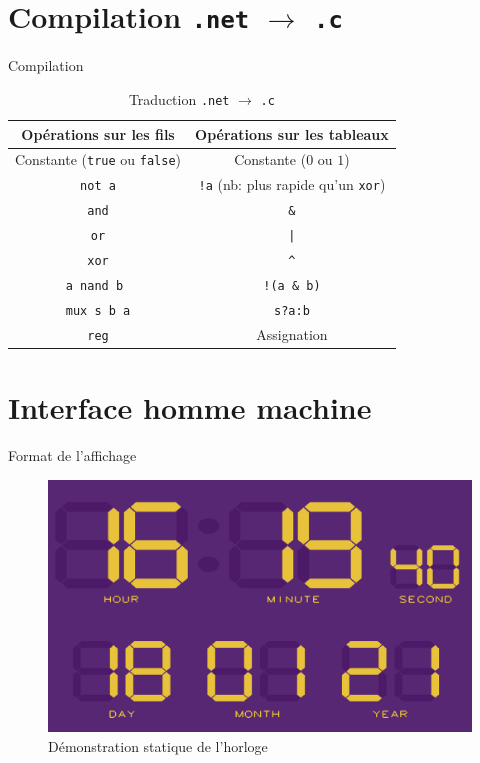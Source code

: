 \documentclass[intlimits, 10pt]{beamer}
\begin{document}
	\section{Compilation \texttt{.net} $\rightarrow$ \texttt{.c}}
	
	\begin{frame}{Compilation}
			\begin{table}
				\begin{tabular}{|c|c|}
				\hline
				Opérations sur les fils & Opérations sur les tableaux \\
				\hline
				Constante (\texttt{true} ou \texttt{false})& Constante ($0$ ou $1$)  \\
				\hline
				\texttt{not a}& \texttt{!a}  (nb: plus rapide qu'un \texttt{xor})\\
				\hline
				\texttt{and} & \texttt{\&}  \\
				\hline
				\texttt{or}& \texttt{|} \\
				\hline
				\texttt{xor}& \texttt{\^} \\
				\hline
				\texttt{a nand b }& \texttt{!(a \& b)} \\
				\hline
				\texttt{mux s b a}& \texttt{s?a:b} \\
				\hline
				\texttt{reg}&Assignation\\
				\hline
			\end{tabular}
			\caption{Traduction \texttt{.net} $\rightarrow$ \texttt{.c}}
		\end{table}
	\end{frame}
	
	\section{Interface homme machine}
	
	\begin{frame}{Format de l'affichage}
		\begin{figure}
			\centering
			\includegraphics[width=0.7\linewidth]{../Rapport/2021-01-18_16-19}
			\caption{Démonstration statique de l'horloge}
			\label{fig:2021-01-1816-19}
		\end{figure}
		
	\end{frame}
	
\end{document}
